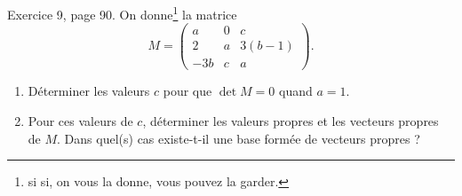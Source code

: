 \begin{exercice}\label{exoLineraire0035}

	Exercice 9, page 90. On donne\footnote{si si, on vous la donne, vous pouvez la garder.} la matrice
	\begin{equation}
		M=\begin{pmatrix}
			a	&	0	&	c\\ 
			2	&	a	&	3(b-1)\\ 
			-3b	&	c	&	a	  
		\end{pmatrix}.
	\end{equation}
	\begin{enumerate}

		\item
			Déterminer les valeurs $c$ pour que $\det M=0$ quand $a=1$.

		\item
			Pour ces valeurs de $c$, déterminer les valeurs propres et les vecteurs propres de $M$. Dans quel(s) cas existe-t-il une base formée de vecteurs propres ?

	\end{enumerate}
	

\end{exercice}
